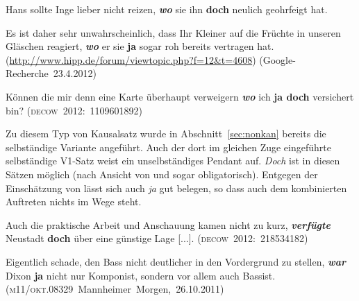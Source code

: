 \begin{exe}
	\ex\label{370} 
	Hans sollte Inge lieber nicht reizen, \textbf{\textit{wo}} sie ihn \textbf{doch} neulich geohrfeigt hat.	
	\newline\hbox{}\hfill\hbox{\citet[77]{Borst1985}}
\end{exe}	

\begin{exe}
	\ex\label{371} 

	Es ist daher sehr unwahrscheinlich, dass Ihr Kleiner auf die Früchte in unseren Gläschen reagiert, \textit{\textbf{wo}} er sie \textbf{ja} sogar roh 		bereits vertragen hat.	
	\hfill\hbox{\small(\url{http://www.hipp.de/forum/viewtopic.php?f=12\&t=4608})}
	\newline
	\hbox{}\hfill\hbox{(Google-Recherche 23.4.2012)}
\end{exe}

\begin{exe}
	\ex\label{372} 
	Können die mir denn eine Karte überhaupt verweigern \textbf{\textit{wo}} ich \textbf{ja doch} versichert bin?
	\hfill\hbox{\scshape(decow 2012: 1109601892)}
\end{exe}
Zu diesem Typ von Kausalsatz wurde in Abschnitt~\ref{sec:nonkan} bereits die selbständige Variante angeführt. Auch der dort im gleichen Zuge eingeführte selbständige V1-Satz weist ein unselbständiges Pendant auf. \textit{Doch} ist in diesen Sätzen möglich (nach Ansicht von \citealt[77--80]{Borst1985} und \citealt[13]{Rinas2006} sogar obligatorisch). Entgegen der Einschätzung von \citet[213]{Rinas2006} lässt sich auch \textit{ja} gut belegen, so dass auch dem kombinierten Auftreten nichts im Wege steht.
	
\begin{exe}
	\ex\label{373} 

	Auch die praktische Arbeit und Anschauung kamen nicht zu kurz, \textbf{\textit{verfügte}} Neustadt \textbf{doch} über eine günstige Lage [...].	
	\hfill\hbox{\scshape(decow 2012: 218534182)}
\end{exe}	
	
\begin{exe}
	\ex\label{374} 

	Eigentlich schade, den Bass nicht deutlicher in den Vordergrund zu stellen, \textbf{\textit{war}} Dixon \textbf{ja} nicht nur Komponist, sondern vor 		allem auch Bassist. 
	\newline\hbox{}\hfill\hbox{(\textsc{m11/okt.08329} Mannheimer Morgen, 26.10.2011)}
\end{exe}

